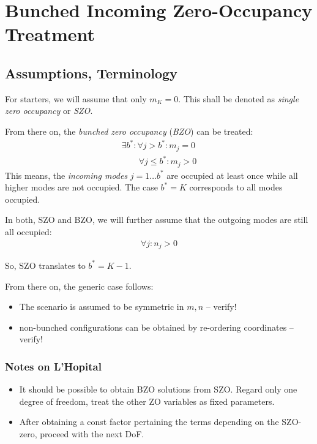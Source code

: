 \documentclass[
	english,
	a4paper,
	fontsize=10pt,
	parskip=half,
	titlepage=true,
	DIV=12,
	final
]{scrreprt}
\title{\myTitle}
\author{\myName}
\date{\today}
\begin{document}
\tableofcontents
\newpage

\chapter{Bunched Incoming Zero-Occupancy Treatment}
\section{Assumptions, Terminology}
For starters, we will assume that only $m_K = 0$. This shall be denoted as \emph{single zero occupancy} or \emph{SZO}.

From there on, the \emph{bunched zero occupancy} (\emph{BZO}) can be treated:
\begin{align}
	\exists b^{*} : \forall j > b^{*} : m_j = 0 \\
	\qquad \forall j \leq b^* : m_j > 0
\end{align}
This means, the \emph{incoming modes} $j = 1 \ldots b^{*}$ are occupied at least once while all higher modes are not occupied. The case $b^* = K$ corresponds to all modes occupied.

In both, SZO and BZO, we will further assume that the outgoing modes are still all occupied:
\begin{align}
	\forall j : n_j > 0
\end{align}

So, SZO translates to $b^* = K - 1$.

From there on, the generic case follows:
\begin{itemize}
\item The scenario is assumed to be symmetric in $m, n$ -- verify!
\item non-bunched configurations can be obtained by re-ordering coordinates -- verify!
\end{itemize}

\subsection{Notes on L'Hopital}
\begin{itemize}
\item It should be possible to obtain BZO solutions from SZO. Regard only one degree of freedom, treat the other ZO variables as fixed parameters.
\item After obtaining a const factor pertaining the terms depending on the SZO-zero, proceed with the next DoF.
\end{itemize}
\end{document}
